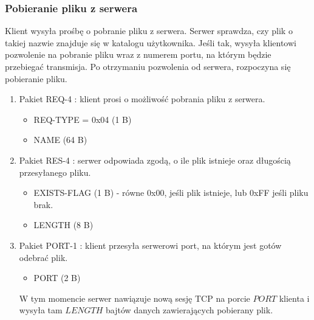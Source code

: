 \documentclass{article}
\begin{document}
	\subsubsection{Pobieranie pliku z serwera}
	Klient wysyła prośbę o pobranie pliku z serwera. Serwer sprawdza, czy plik o takiej nazwie znajduje się w katalogu użytkownika. Jeśli tak, wysyła klientowi pozwolenie na pobranie pliku wraz z numerem portu, na którym będzie przebiegać transmisja. Po otrzymaniu pozwolenia od serwera, rozpoczyna się pobieranie pliku. 
	
	\begin{enumerate}
		\item Pakiet REQ-4 \label{REQ-4}: klient prosi o możliwość pobrania pliku z serwera. 
		\begin{itemize}
			\item REQ-TYPE = 0x04 (1 B)
			\item NAME (64 B)
		\end{itemize}
	
		\item Pakiet RES-4 \label{RES-4}: serwer odpowiada zgodą, o ile plik istnieje oraz długością przesyłanego pliku. 
		\begin{itemize}
			\item EXISTS-FLAG (1 B) - równe 0x00, jeśli plik istnieje, lub 0xFF jeśli pliku brak. 
			\item LENGTH (8 B)
		\end{itemize}
	
		\item Pakiet PORT-1 \label{PORT-1}: klient przesyła serwerowi port, na którym jest gotów odebrać plik. 
		\begin{itemize}
			\item PORT (2 B)
		\end{itemize}
	
		W tym momencie serwer nawiązuje nową sesję TCP na porcie $PORT$ klienta i wysyła tam $LENGTH$ bajtów danych zawierających pobierany plik. 
		
	\end{enumerate}
\end{document}
